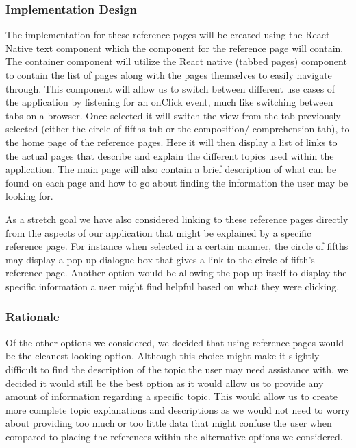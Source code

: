 \documentclass[onecolumn, draftclsnofoot,10pt, compsoc]{IEEEtran}
\begin{document}
\subsubsection{Implementation Design}
The implementation for these reference pages will be created using the React Native text component which the component for the reference page will contain.
The container component will utilize the React native (tabbed pages) component to contain the list of pages along with the pages themselves to easily navigate through.
This component will allow us to switch between different use cases of the application by listening for an onClick event, much like switching between tabs on a browser.
Once selected it will switch the view from the tab previously selected (either the circle of fifths tab or the composition/ comprehension tab), to the home page of the reference pages.
Here it will then display a list of links to the actual pages that describe and explain the different topics used within the application.
The main page will also contain a brief description of what can be found on each page and how to go about finding the information the user may be looking for. 

As a stretch goal we have also considered linking to these reference pages directly from the aspects of our application that might be explained by a specific reference page.
For instance when selected in a certain manner, the circle of fifths may display a pop-up dialogue box that gives a link to the circle of fifth’s reference page.
Another option would be allowing the pop-up itself to display the specific information a user might find helpful based on what they were clicking.

\subsubsection{Rationale}
Of the other options we considered, we decided that using reference pages would be the cleanest looking option.
Although this choice might make it slightly difficult to find the description of the topic the user may need assistance with, we decided it would still be the best option as it would allow us to provide any amount of information regarding a specific topic.
This would allow us to create more complete topic explanations and descriptions as we would not need to worry about providing too much or too little data that might confuse the user when compared to placing the references within the alternative options we considered.
\end{document}
